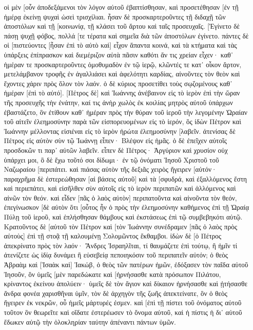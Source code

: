οἱ μὲν [οὖν ἀποδεξάμενοι τὸν λόγον αὐτοῦ ἐβαπτίσθησαν, καὶ προσετέθησαν [ἐν τῇ ἡμέρᾳ ἐκείνῃ ψυχαὶ ὡσεὶ τρισχίλιαι. 
ἦσαν δὲ προσκαρτεροῦντες τῇ διδαχῇ τῶν ἀποστόλων καὶ τῇ [κοινωνίᾳ, τῇ κλάσει τοῦ ἄρτου καὶ ταῖς προσευχαῖς. 
[Ἐγίνετο δὲ πάσῃ ψυχῇ φόβος, πολλά [τε τέρατα καὶ σημεῖα διὰ τῶν ἀποστόλων ἐγίνετο. 
πάντες δὲ οἱ [πιστεύοντες [ἦσαν ἐπὶ τὸ αὐτὸ καὶ] εἶχον ἅπαντα κοινά, 
καὶ τὰ κτήματα καὶ τὰς ὑπάρξεις ἐπίπρασκον καὶ διεμέριζον αὐτὰ πᾶσιν καθότι ἄν τις χρείαν εἶχεν· 
καθ᾽ ἡμέραν τε προσκαρτεροῦντες ὁμοθυμαδὸν ἐν τῷ ἱερῷ, κλῶντές τε κατ᾽ οἶκον ἄρτον, μετελάμβανον τροφῆς ἐν ἀγαλλιάσει καὶ ἀφελότητι καρδίας, 
αἰνοῦντες τὸν θεὸν καὶ ἔχοντες χάριν πρὸς ὅλον τὸν λαόν. ὁ δὲ κύριος προσετίθει τοὺς σῳζομένους καθ᾽ ἡμέραν [ἐπὶ τὸ αὐτό]. 
[Πέτρος δὲ] καὶ Ἰωάννης ἀνέβαινον εἰς τὸ ἱερὸν ἐπὶ τὴν ὥραν τῆς προσευχῆς τὴν ἐνάτην, 
καί τις ἀνὴρ χωλὸς ἐκ κοιλίας μητρὸς αὐτοῦ ὑπάρχων ἐβαστάζετο, ὃν ἐτίθουν καθ᾽ ἡμέραν πρὸς τὴν θύραν τοῦ ἱεροῦ τὴν λεγομένην Ὡραίαν τοῦ αἰτεῖν ἐλεημοσύνην παρὰ τῶν εἰσπορευομένων εἰς τὸ ἱερόν, 
ὃς ἰδὼν Πέτρον καὶ Ἰωάννην μέλλοντας εἰσιέναι εἰς τὸ ἱερὸν ἠρώτα ἐλεημοσύνην [λαβεῖν. 
ἀτενίσας δὲ Πέτρος εἰς αὐτὸν σὺν τῷ Ἰωάννῃ εἶπεν· Βλέψον εἰς ἡμᾶς. 
ὁ δὲ ἐπεῖχεν αὐτοῖς προσδοκῶν τι παρ᾽ αὐτῶν λαβεῖν. 
εἶπεν δὲ Πέτρος· Ἀργύριον καὶ χρυσίον οὐχ ὑπάρχει μοι, ὃ δὲ ἔχω τοῦτό σοι δίδωμι· ἐν τῷ ὀνόματι Ἰησοῦ Χριστοῦ τοῦ Ναζωραίου [περιπάτει. 
καὶ πιάσας αὐτὸν τῆς δεξιᾶς χειρὸς ἤγειρεν [αὐτόν· παραχρῆμα δὲ ἐστερεώθησαν [αἱ βάσεις αὐτοῦ] καὶ τὰ [σφυδρά, 
καὶ ἐξαλλόμενος ἔστη καὶ περιεπάτει, καὶ εἰσῆλθεν σὺν αὐτοῖς εἰς τὸ ἱερὸν περιπατῶν καὶ ἁλλόμενος καὶ αἰνῶν τὸν θεόν. 
καὶ εἶδεν [πᾶς ὁ λαὸς αὐτὸν] περιπατοῦντα καὶ αἰνοῦντα τὸν θεόν, 
ἐπεγίνωσκον [δὲ αὐτὸν ὅτι [οὗτος ἦν ὁ πρὸς τὴν ἐλεημοσύνην καθήμενος ἐπὶ τῇ Ὡραίᾳ Πύλῃ τοῦ ἱεροῦ, καὶ ἐπλήσθησαν θάμβους καὶ ἐκστάσεως ἐπὶ τῷ συμβεβηκότι αὐτῷ. 
Κρατοῦντος δὲ [αὐτοῦ τὸν Πέτρον καὶ [τὸν Ἰωάννην συνέδραμεν [πᾶς ὁ λαὸς πρὸς αὐτοὺς] ἐπὶ τῇ στοᾷ τῇ καλουμένῃ Σολομῶντος ἔκθαμβοι. 
ἰδὼν δὲ [ὁ Πέτρος ἀπεκρίνατο πρὸς τὸν λαόν· Ἄνδρες Ἰσραηλῖται, τί θαυμάζετε ἐπὶ τούτῳ, ἢ ἡμῖν τί ἀτενίζετε ὡς ἰδίᾳ δυνάμει ἢ εὐσεβείᾳ πεποιηκόσιν τοῦ περιπατεῖν αὐτόν; 
ὁ θεὸς Ἀβραὰμ καὶ [Ἰσαὰκ καὶ] Ἰακώβ, ὁ θεὸς τῶν πατέρων ἡμῶν, ἐδόξασεν τὸν παῖδα αὐτοῦ Ἰησοῦν, ὃν ὑμεῖς [μὲν παρεδώκατε καὶ [ἠρνήσασθε κατὰ πρόσωπον Πιλάτου, κρίναντος ἐκείνου ἀπολύειν· 
ὑμεῖς δὲ τὸν ἅγιον καὶ δίκαιον ἠρνήσασθε καὶ ᾐτήσασθε ἄνδρα φονέα χαρισθῆναι ὑμῖν, 
τὸν δὲ ἀρχηγὸν τῆς ζωῆς ἀπεκτείνατε, ὃν ὁ θεὸς ἤγειρεν ἐκ νεκρῶν, οὗ ἡμεῖς μάρτυρές ἐσμεν. 
καὶ [ἐπὶ τῇ πίστει τοῦ ὀνόματος αὐτοῦ τοῦτον ὃν θεωρεῖτε καὶ οἴδατε ἐστερέωσεν τὸ ὄνομα αὐτοῦ, καὶ ἡ πίστις ἡ δι᾽ αὐτοῦ ἔδωκεν αὐτῷ τὴν ὁλοκληρίαν ταύτην ἀπέναντι πάντων ὑμῶν. 
